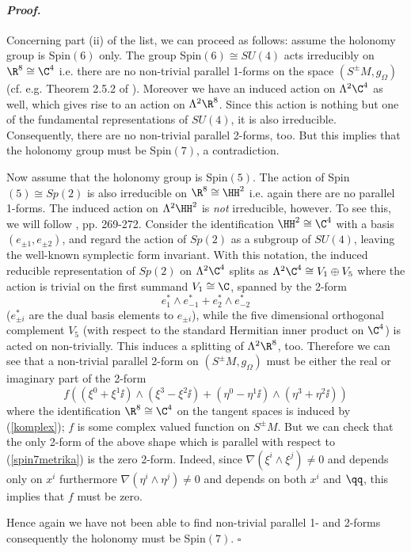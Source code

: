 \documentclass[a4paper,12pt,draft]{article}
\newenvironment{proof}{\paragraph{\it Proof.}}{$\square$\vskip0.4cm}
\begin{document}
\begin{proof}
Concerning part (ii) of the list, we can proceed as follows: assume the
holonomy group is Spin$(6)$ only. The group
Spin$(6)\cong SU(4)$ acts irreducibly on $\R^8\cong\C^4$ i.e. there are
no non-trivial parallel 1-forms on the space $(S^\pm M, g_\Omega
)$ (cf. e.g. Theorem 2.5.2 of \cite{joy}). Moreover we have an
induced action on $\Lambda^2\C^4$ as well, which
gives rise to an action on $\Lambda^2\R^8$. Since this action is nothing
but one of the fundamental representations of $SU(4)$, it is also
irreducible. Consequently, there are no non-trivial parallel 2-forms,
too. But this implies that the holonomy group must be Spin$(7)$, a
contradiction.

Now assume that the holonomy group is Spin$(5)$. The action of
Spin$(5)\cong Sp(2)$ is also irreducible on $\R^8\cong\HH^2$ i.e. again
there are no parallel 1-forms. The induced action
on $\Lambda^2\HH^2$ is {\it not} irreducible, however. To see this,
we will follow \cite{bro-tom}, pp. 269-272. Consider the identification 
$\HH^2\cong\C^4$ with a basis $(e_{\pm 1}, e_{\pm 2})$, and regard the
action of $Sp(2)$ as a subgroup of $SU(4)$, leaving the well-known   
symplectic form invariant. With this notation, the induced
reducible representation of $Sp(2)$ on $\Lambda^2\C^4$ splits as
$\Lambda^2\C^4\cong V_1\oplus V_5$
where the action is trivial on the first summand $V_1\cong\C$, spanned by
the 2-form
\[e^*_1\wedge e^*_{-1}+e^*_2\wedge e^*_{-2}\]
($e^*_{\pm i}$ are the dual basis elements to $e_{\pm i}$), while the five
dimensional orthogonal complement $V_5$ (with respect to
the standard Hermitian inner product on $\C^4$) is acted on
non-trivially. This induces a splitting of $\Lambda^2\R^8$, too. Therefore
we can see that a non-trivial parallel 2-form on $(S^\pm M, g_\Omega )$
must be either the real or imaginary part of the 2-form 
\[f((\xi^0+\xi^1\ii
)\wedge (\xi^3-\xi^2\ii )+(\eta^0-\eta^1\ii )\wedge
(\eta^3+\eta^2\ii ))\]
where the identification $\R^8\cong\C^4$ on the
tangent spaces is induced by (\ref{komplex}); $f$ is some complex valued
function on $S^\pm M$. But we can check that
the only 2-form of the above shape which is parallel with respect to
(\ref{spin7metrika}) is the zero  2-form. Indeed, since $\nabla
(\xi^i\wedge\xi^j)\not= 0$ and depends only on $x^i$
furthermore $\nabla (\eta^i\wedge\eta^j)\not= 0$ and depends on both $x^i$ 
and $\qq$, this implies that $f$ must be zero.

Hence again we have not been able to find non-trivial parallel 1- and
2-forms consequently the holonomy must be Spin$(7)$.
\end{proof}
\end{document}
